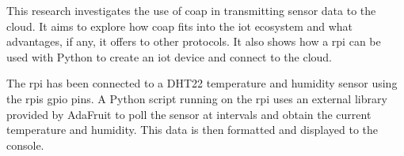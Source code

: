 This research investigates the use of \gls{coap} in transmitting sensor data
to the cloud. It aims to explore how \gls{coap} fits into the \gls{iot} ecosystem and
what advantages, if any, it offers to other protocols. It also shows how a \gls{rpi} can
be used with Python to create an \gls{iot} device and connect to the cloud. 

The \gls{rpi} has been connected to a DHT22 temperature and humidity sensor using
the \glspl{rpi} \gls{gpio} pins. A Python script running on the \gls{rpi} uses
an external library provided by AdaFruit to poll the sensor at intervals and 
obtain the current temperature and humidity. This data is then formatted and
displayed to the console.